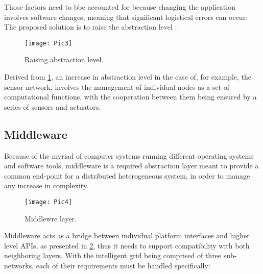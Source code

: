 Those factors need to bbe accounted for because changing the application involves software changes, meaning that significant logistical
errors can occur. The proposed solution is to raise the abstraction level \cite{38}:

\begin{figure}[H]
	\texttt{[image: Pic3]}
    \caption{Raising abstraction level. \cite{38} \label{fig:abstractionLevel}}
\end{figure}

Derived from \cref{fig:abstractionLevel}, an increase in abstraction level in the case of, for example, the sensor network, involves the
management of individual nodes as a set of computational functions, with the cooperation between them being ensured by a series of sensors
and actuators.

\subsection{Middleware}

Because of the myriad of computer systems running different operating systems and software tools, middleware is a required abstraction
layer meant to provide a common end-point for a distributed heterogeneous system, in order to manage any increase in complexity.

\begin{figure}[H]
	\texttt{[image: Pic4]}
    \caption{Middlewre layer. \cite{72} \label{fig:middleware}}
\end{figure}

Middleware acts as a bridge between individual platform interfaces and higher level APIs, as presented in \cref{fig:middleware}, thus it needs
to support compatibility with both neighboring layers. With the intelligent grid being comprised of three sub-networks, each of their 
requirements must be handled specifically:

